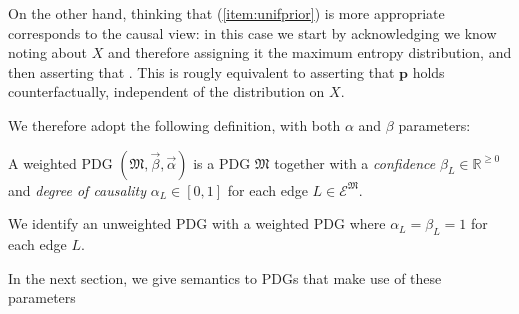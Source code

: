 \documentclass{article}
\theoremstyle{plain}
\theoremstyle{definition}
\newenvironment{example}
	{\pushQED{\qed}\renewcommand{\qedsymbol}{$\triangle$}\examplex}
	{\popQED\endexamplex%
}
\theoremstyle{remark}
\newcommand\mat[1]{\mathbf{#1}}
\newcommand{\Ed}{\mathcal E}
\newcommand{\dg}[1]{\mathfrak{#1}}
\numberwithin{equation}{section}
\begin{document}
{\begin{example}
		
		On the other hand, thinking that (\ref{item:unifprior}) is more appropriate corresponds to the causal view: in this case we start by acknowledging we know noting about $X$ and therefore assigning it the maximum entropy distribution, and then asserting that . This is rougly equivalent to asserting that $\mat p$ holds counterfactually, independent of the distribution on $X$. 
	\end{example}
	
	We therefore adopt the following definition, with both $\alpha$ and $\beta$ parameters:

	\begin{defn}
		A weighted PDG $(\dg M, \vec \beta, \vec \alpha)$ is a PDG
	        $\dg M$ together with a \emph{confidence} $\beta_L \in \mathbb
	        R^{\geq 0}$ and \emph{degree of causality} $\alpha_L \in
	        [0,1]$ for each edge $L \in \Ed^\dg M$. 
	\end{defn}

	We identify an unweighted PDG with a weighted PDG where $\alpha_L
	= \beta_L = 1$ for each edge $L$.
}
%
In the next section, we give semantics to PDGs that make use of
these parameters



\end{document}
